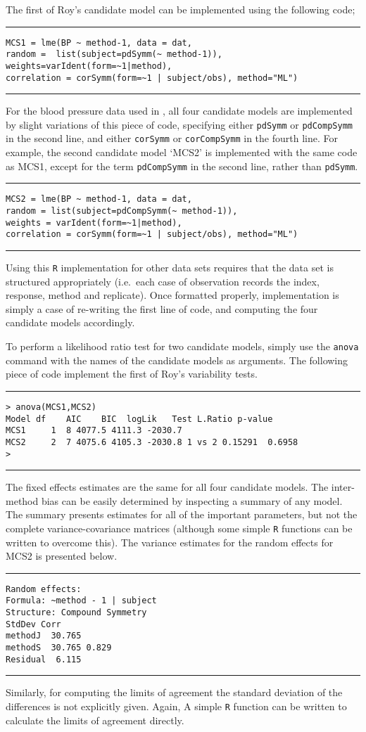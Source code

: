 \documentclass[12pt, a4paper]{report}
\theoremstyle{plain}
\theoremstyle{definition}
\theoremstyle{remark}
\begin{document}
The first of Roy's candidate model can be implemented using the following code;\\
\hrule
\begin{verbatim}
MCS1 = lme(BP ~ method-1, data = dat,
random =  list(subject=pdSymm(~ method-1)),
weights=varIdent(form=~1|method),
correlation = corSymm(form=~1 | subject/obs), method="ML")
\end{verbatim}
\hrule
\vspace{1cm}
For the blood pressure data used in \citet{roy}, all four candidate models are implemented by slight variations of this piece of code, specifying either \texttt{pdSymm} or \texttt{pdCompSymm} in the second line, and either \texttt{corSymm} or \texttt{corCompSymm} in the fourth line.
For example, the second candidate model `MCS2' is implemented with the same code as MCS1, except for the term \texttt{pdCompSymm} in the second line, rather than \texttt{pdSymm}.
\\
\hrule
\begin{verbatim}
MCS2 = lme(BP ~ method-1, data = dat,
random = list(subject=pdCompSymm(~ method-1)),
weights = varIdent(form=~1|method),
correlation = corSymm(form=~1 | subject/obs), method="ML")
\end{verbatim}
\hrule
\vspace{1cm}
Using this \texttt{R} implementation for other data sets requires that the data set is structured appropriately (i.e.\ each case of observation records the index, response, method and replicate). Once formatted properly, implementation is simply a case of re-writing the first line of code, and computing the four candidate models accordingly.

To perform a likelihood ratio test for two candidate models, simply use the \texttt{anova} command with the names of the candidate models as arguments. The following piece of code implement the first of Roy's variability tests.
\\
\hrule
\begin{verbatim}
> anova(MCS1,MCS2)
Model df    AIC    BIC  logLik   Test L.Ratio p-value
MCS1     1  8 4077.5 4111.3 -2030.7
MCS2     2  7 4075.6 4105.3 -2030.8 1 vs 2 0.15291  0.6958
>
\end{verbatim}
\hrule
\vspace{1cm}
The fixed effects estimates are the same for all four candidate models. The inter-method bias can be easily determined by inspecting a summary of any model. The summary presents estimates for all of the important parameters, but not the complete variance-covariance matrices (although some simple \texttt{R} functions can be written to overcome this). The variance estimates for the random effects for MCS2 is presented below.
\\
\hrule
\begin{verbatim}
Random effects:
Formula: ~method - 1 | subject
Structure: Compound Symmetry
StdDev Corr
methodJ  30.765
methodS  30.765 0.829
Residual  6.115
\end{verbatim}
\hrule
\vspace{1cm}
Similarly, for computing the limits of agreement the standard deviation of the differences is not explicitly given. Again, A simple \texttt{R} function can be written to calculate the limits of agreement directly.
\end{document}
